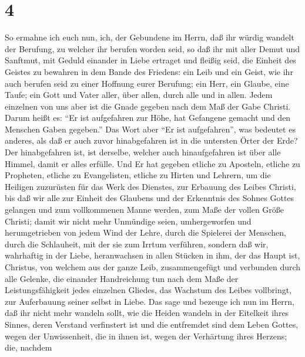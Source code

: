 \hypertarget{section-3}{%
\section{4}\label{section-3}}

 So ermahne ich euch nun, ich, der Gebundene im Herrn, daß
ihr würdig wandelt der Berufung, zu welcher ihr berufen worden seid,
 so daß ihr mit aller Demut und Sanftmut, mit Geduld
einander in Liebe ertraget  und fleißig seid, die Einheit
des Geistes zu bewahren in dem Bande des Friedens:  ein
Leib und ein Geist, wie ihr auch berufen seid zu einer Hoffnung eurer
Berufung;  ein Herr, ein Glaube, eine Taufe;
 ein Gott und Vater aller, über allen, durch alle und in
allen.  Jedem einzelnen von uns aber ist die Gnade gegeben
nach dem Maß der Gabe Christi.  Darum heißt es: ``Er ist
aufgefahren zur Höhe, hat Gefangene gemacht und den Menschen Gaben
gegeben.''  Das Wort aber ``Er ist aufgefahren'', was
bedeutet es anderes, als daß er auch zuvor hinabgefahren ist in die
untersten Örter der Erde?  Der hinabgefahren ist, ist
derselbe, welcher auch hinaufgefahren ist über alle Himmel, damit er
alles erfülle.  Und Er hat gegeben etliche zu Aposteln,
etliche zu Propheten, etliche zu Evangelisten, etliche zu Hirten und
Lehrern,  um die Heiligen zuzurüsten für das Werk des
Dienstes, zur Erbauung des Leibes Christi,  bis daß wir
alle zur Einheit des Glaubens und der Erkenntnis des Sohnes Gottes
gelangen und zum vollkommenen Manne werden, zum Maße der vollen Größe
Christi;  damit wir nicht mehr Unmündige seien,
umhergeworfen und herumgetrieben von jedem Wind der Lehre, durch die
Spielerei der Menschen, durch die Schlauheit, mit der sie zum Irrtum
verführen,  sondern daß wir, wahrhaftig in der Liebe,
heranwachsen in allen Stücken in ihm, der das Haupt ist, Christus,
 von welchem aus der ganze Leib, zusammengefügt und
verbunden durch alle Gelenke, die einander Handreichung tun nach dem
Maße der Leistungsfähigkeit jedes einzelnen Gliedes, das Wachstum des
Leibes vollbringt, zur Auferbauung seiner selbst in Liebe.
 Das sage und bezeuge ich nun im Herrn, daß ihr nicht
mehr wandeln sollt, wie die Heiden wandeln in der Eitelkeit ihres
Sinnes,  deren Verstand verfinstert ist und die
entfremdet sind dem Leben Gottes, wegen der Unwissenheit, die in ihnen
ist, wegen der Verhärtung ihres Herzens;  die, nachdem
